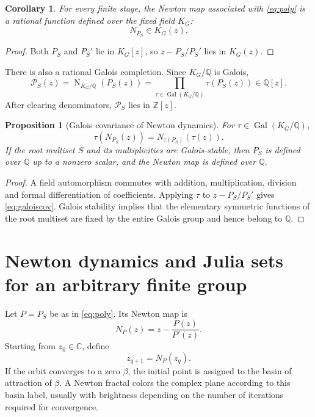 \documentclass[11pt,a4paper]{article}
\newtheorem{proposition}[theorem]{Proposition}
\newtheorem{corollary}[theorem]{Corollary}
\theoremstyle{definition}
\newcommand{\Q}{\mathbb{Q}}
\newcommand{\Z}{\mathbb{Z}}
\newcommand{\C}{\mathbb{C}}
\newcommand{\Gal}{\operatorname{Gal}}
\newcommand{\Nm}{\operatorname{N}}
\begin{document}
\begin{corollary}
For every finite stage, the Newton map associated with \eqref{eq:poly} is a rational function defined over the fixed field $K_G$:
\[
N_{P_S}\in K_G(z).
\]
\end{corollary}

\begin{proof}
Both $P_S$ and $P_S'$ lie in $K_G[z]$, so $z-P_S/P_S'$ lies in $K_G(z)$.
\end{proof}

There is also a rational Galois completion.  Since $K_G/\Q$ is Galois,
\begin{equation}
\label{eq:normpoly}
\mathcal P_S(z)
=\Nm_{K_G/\Q}(P_S(z))
=\prod_{\tau\in\Gal(K_G/\Q)}\tau(P_S(z))
\in\Q[z].
\end{equation}
After clearing denominators, $\mathcal P_S$ lies in $\Z[z]$.

\begin{proposition}[Galois covariance of Newton dynamics]
For $\tau\in\Gal(K_G/\Q)$,
\begin{equation}
\label{eq:galoiscov}
\tau\!\left(N_{P_S}(z)\right)=N_{\tau(P_S)}\!\left(\tau(z)\right).
\end{equation}
If the root multiset $S$ and its multiplicities are Galois-stable, then $P_S$ is defined over $\Q$ up to a nonzero scalar, and the Newton map is defined over $\Q$.
\end{proposition}

\begin{proof}
A field automorphism commutes with addition, multiplication, division and formal differentiation of coefficients.  Applying $\tau$ to $z-P_S/P_S'$ gives \eqref{eq:galoiscov}.  Galois stability implies that the elementary symmetric functions of the root multiset are fixed by the entire Galois group and hence belong to $\Q$.
\end{proof}

\section{Newton dynamics and Julia sets for an arbitrary finite group}

Let $P=P_S$ be as in \eqref{eq:poly}.  Its Newton map is
\begin{equation}
\label{eq:newtonmap}
\boxed{
N_P(z)=z-\frac{P(z)}{P'(z)}.
}
\end{equation}
Starting from $z_0\in\C$, define
\begin{equation}
\label{eq:iteration}
z_{q+1}=N_P(z_q).
\end{equation}
If the orbit converges to a zero $\beta$, the initial point is assigned to the basin of attraction of $\beta$.  A Newton fractal colors the complex plane according to this basin label, usually with brightness depending on the number of iterations required for convergence.
\end{document}
